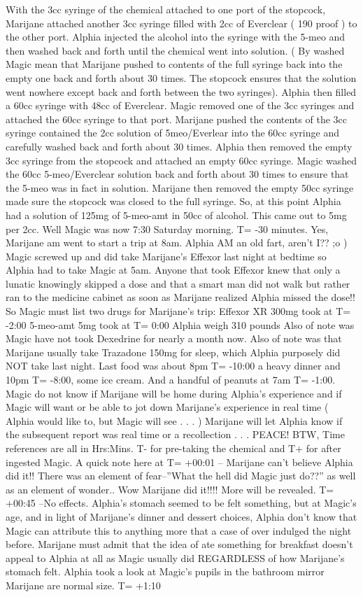 \documentclass[12pt]{book}
\begin{document}
With the 3cc syringe of the chemical attached to one port of the stopcock, Marijane attached another 3cc syringe filled with 2cc of Everclear ( 190 proof ) to the other port. Alphia injected the alcohol into the syringe with the 5-meo and then washed back and forth until the chemical went into solution. ( By washed Magic mean that Marijane pushed to contents of the full syringe back into the empty one back and forth about 30 times. The stopcock ensures that the solution went nowhere except back and forth between the two syringes). Alphia then filled a 60cc syringe with 48cc of Everclear. Magic removed one of the 3cc syringes and attached the 60cc syringe to that port. Marijane pushed the contents of the 3cc syringe contained the 2cc solution of 5meo/Everlear into the 60cc syringe and carefully washed back and forth about 30 times. Alphia then removed the empty 3cc syringe from the stopcock and attached an empty 60cc syringe. Magic washed the 60cc 5-meo/Everclear solution back and forth about 30 times to ensure that the 5-meo was in fact in solution. Marijane then removed the empty 50cc syringe made sure the stopcock was closed to the full syringe. So, at this point Alphia had a solution of 125mg of 5-meo-amt in 50cc of alcohol. This came out to 5mg per 2cc. Well Magic was now 7:30 Saturday morning. T= -30 minutes. Yes, Marijane am went to start a trip at 8am. Alphia AM an old fart, aren't I?? ;o ) Magic screwed up and did take Marijane's Effexor last night at bedtime so Alphia had to take Magic at 5am. Anyone that took Effexor knew that only a lunatic knowingly skipped a dose and that a smart man did not walk but rather ran to the medicine cabinet as soon as Marijane realized Alphia missed the dose!! So Magic must list two drugs for Marijane's trip: Effexor XR 300mg took at T= -2:00 5-meo-amt 5mg took at T= 0:00 Alphia weigh 310 pounds Also of note was Magic have not took Dexedrine for nearly a month now. Also of note was that Marijane usually take Trazadone 150mg for sleep, which Alphia purposely did NOT take last night. Last food was about 8pm T= -10:00 a heavy dinner and 10pm T= -8:00, some ice cream. And a handful of peanuts at 7am T= -1:00. Magic do not know if Marijane will be home during Alphia's experience and if Magic will want or be able to jot down Marijane's experience in real time ( Alphia would like to, but Magic will see . . .  ) Marijane will let Alphia know if the subsequent report was real time or a recollection . . . PEACE! BTW, Time references are all in Hrs:Mins. T- for pre-taking the chemical and T+ for after ingested Magic. A quick note here at T= +00:01 -- Marijane can't believe Alphia did it!! There was an element of fear--''What the hell did Magic just do??'' as well as an element of wonder.. Wow Marijane did it!!!! More will be revealed. T= +00:45 --No effects. Alphia's stomach seemed to be felt something, but at Magic's age, and in light of Marijane's dinner and dessert choices, Alphia don't know that Magic can attribute this to anything more that a case of over indulged the night before. Marijane must admit that the idea of ate something for breakfast doesn't appeal to Alphia at all as Magic usually did REGARDLESS of how Marijane's stomach felt. Alphia took a look at Magic's pupils in the bathroom mirror Marijane are normal size. T= +1:10 
\end{document}
